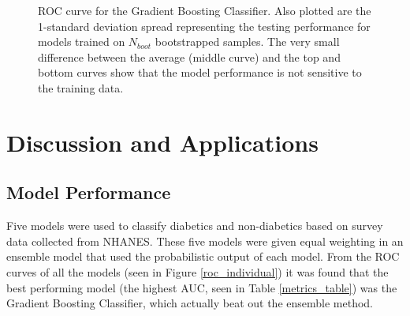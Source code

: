 \documentclass{article} %
\begin{document}
\begin{figure}[h]
\begin{center}
\end{center}
\caption{ROC curve for the Gradient Boosting Classifier. Also plotted are the 1-standard deviation spread representing the testing performance for models trained on $N_{boot}$ bootstrapped samples. The very small difference between the average (middle curve) and the top and bottom curves show that the model performance is not sensitive to the training data.}
\label{roc_error_decision}
\end{figure}

\section{Discussion and Applications}

\subsection{Model Performance}

Five models were used to classify diabetics and non-diabetics based on survey data collected from NHANES. These five models were given equal weighting in an ensemble model that used the probabilistic output of each model. From the ROC curves of all the models (seen in Figure \ref{roc_individual}) it was found that the best performing model (the highest AUC, seen in Table \ref{metrics_table}) was the Gradient Boosting Classifier, which actually beat out the ensemble method. 
\end{document}
